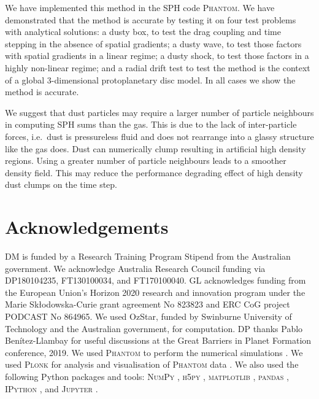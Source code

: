 \documentclass[fleqn,usenatbib]{mnras}
\begin{document}
We have implemented this method in the SPH code \textsc{Phantom}. We have
demonstrated that the method is accurate by testing it on four test problems
with analytical solutions: a dusty box, to test the drag coupling and time
stepping in the absence of spatial gradients; a dusty wave, to test those
factors with spatial gradients in a linear regime; a dusty shock, to test those
factors in a highly non-linear regime; and a radial drift test to test the
method is the context of a global 3-dimensional protoplanetary disc model. In
all cases we show the method is accurate.

We suggest that dust particles may require a larger number of particle
neighbours in computing SPH sums than the gas. This is due to the lack of
inter-particle forces, i.e.\ dust is pressureless fluid and does not rearrange
into a glassy structure like the gas does. Dust can numerically clump resulting
in artificial high density regions. Using a greater number of particle
neighbours leads to a smoother density field. This may reduce the performance
degrading effect of high density dust clumps on the time step.


\section*{Acknowledgements}

DM is funded by a Research Training Program Stipend from the Australian
government. We acknowledge Australia Research Council funding via DP180104235,
FT130100034, and FT170100040. GL acknowledges funding from the European Union's
Horizon 2020 research and innovation program under the Marie Sk\l{}odowska-Curie
grant agreement No 823823 and ERC CoG project PODCAST No 864965. We used OzStar,
funded by Swinburne University of Technology and the Australian government, for
computation. DP thanks Pablo Benítez-Llambay for useful discussions at the Great
Barriers in Planet Formation conference, 2019. We used \textsc{Phantom} to
perform the numerical simulations \citep{Price2018PASA...35...31P}. We used
\textsc{Plonk} for analysis and visualisation of \textsc{Phantom} data
\citep{Mentiplay2019JOSS....4.1884M}. We also used the following Python packages
and tools: \textsc{NumPy} \citep{Oliphant2006, van-der-Walt2011CSE....13b..22V},
\textsc{h5py} \citep{Collette2013}, \textsc{matplotlib}
\citep{Hunter2007CSE.....9...90H}, \textsc{pandas} \citep{McKinney2010},
\textsc{IPython} \citep{Perez2007CSE.....9c..21P}, and \textsc{Jupyter}
\citep{Kluyver2016}.
\end{document}
